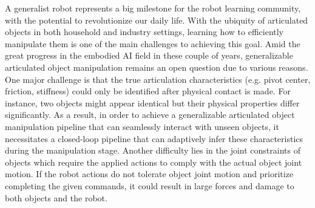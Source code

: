 A generalist robot represents a big milestone for the robot learning community, with the potential to revolutionize our daily life. With the ubiquity of articulated objects in both household and industry settings, learning how to efficiently manipulate them is one of the main challenges to achieving this goal. Amid the great progress in the embodied AI field in these couple of years\cite{zhang2023gamma, ha2024umionlegs, forcecontrolepfl, agilebutsafe}, generalizable articulated object manipulation remains an open question due to various reasons. One major challenge is that the true articulation characteristics (e.g. pivot center, friction, stiffness) could only be identified after physical contact is made. For instance, two objects might appear identical but their physical properties differ significantly. As a result, in order to achieve a generalizable articulated object manipulation pipeline that can seamlessly interact with unseen objects, it necessitates a closed-loop pipeline that can adaptively infer these characteristics during the manipulation stage. Another difficulty lies in the joint constraints of objects which require the applied actions to comply with the actual object joint motion. If the robot actions do not tolerate object joint motion and prioritize completing the given commands, it could result in large forces and damage to both objects and the robot.


